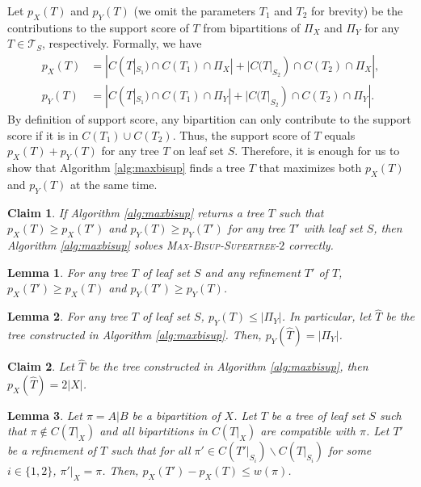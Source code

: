 \documentclass{article}
\newtheorem{lemma}{Lemma}
\newtheorem{claim}{Claim}
\begin{document}
Let $p_X(T)$ and $p_Y(T)$ (we omit the parameters $T_1$ and $T_2$ for brevity) be the contributions to the support score of $T$ from bipartitions of $\Pi_X$ and $\Pi_Y$ for any $T \in \mathcal{T}_S$, respectively. Formally, we have 
\begin{align*}
    p_X(T) &= |C(T|_{S_1}) \cap C(T_1) \cap \Pi_X| + |C(T|_{S_2}) \cap C(T_2) \cap \Pi_X|,\\
    p_Y(T) &= |C(T|_{S_1}) \cap C(T_1) \cap \Pi_Y| + |C(T|_{S_2}) \cap C(T_2) \cap \Pi_Y|.
\end{align*}
By definition of support score, any bipartition can only contribute to the support score if it is in $C(T_1) \cup C(T_2)$. Thus, the support score of $T$ equals $p_X(T) + p_Y(T)$ for any tree $T$ on leaf set $S$. Therefore, it is enough for us to show that Algorithm \ref{alg:maxbisup} finds a tree $T$ that maximizes both $p_X(T)$ and $p_Y(T)$ at the same time.

\begin{claim} \label{claim:sum_score_solves_prob}
    If Algorithm \ref{alg:maxbisup} returns a tree $T$ such that $p_X(T) \ge p_X(T')$ and $p_Y(T) \ge p_Y(T')$ for any tree $T'$ with leaf set $S$, then Algorithm \ref{alg:maxbisup} solves \textsc{Max-Bisup-Supertree-$2$} correctly.
\end{claim}

\begin{lemma}\label{lem:refine_only_increases}
    For any tree $T$ of leaf set $S$ and any refinement $T'$ of $T$, $p_X(T')\ge p_X(T)$ and $p_Y(T') \ge p_Y(T)$.
\end{lemma}

\begin{lemma}\label{lem:max_pY}
    For any tree $T$ of leaf set $S$, $p_Y(T) \le |\Pi_Y|$. In particular, let $\hat{T}$ be the tree constructed in Algorithm \ref{alg:maxbisup}. Then, $p_Y(\hat{T}) = |\Pi_Y|$. 
\end{lemma}

\begin{claim} \label{claim:begin}
    Let $\hat{T}$ be the tree constructed in Algorithm \ref{alg:maxbisup}, then $p_X(\hat{T}) = 2 |X|$. 
\end{claim}

\begin{lemma} \label{lem:one_bipar_upperbound}
    Let $\pi = A|B$ be a bipartition of $X$. Let $T$ be a tree of leaf set $S$ such that $\pi \notin C(T|_X)$ and all bipartitions in $C(T|_X)$ are compatible with $\pi$. Let $T'$ be a refinement of $T$ such that for all $\pi' \in C(T'|_{S_i}) \backslash C(T|_{S_i})$ for some $i \in \{1,2\}$, $\pi'|_X = \pi$. Then, $p_X(T') - p_X(T) \le w(\pi)$. 
\end{lemma}
\end{document}
